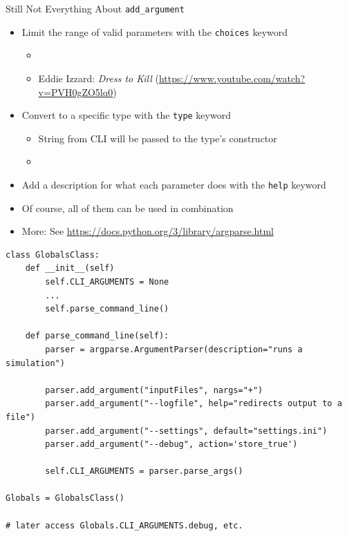 \begin{frame}[fragile]{Still Not Everything About \texttt{add\_argument}}
%
\begin{itemize}
\item Limit the range of valid parameters with the \texttt{choices} keyword
	\begin{itemize}
	\item {}
	\item Eddie Izzard: \emph{Dress to Kill} (\url{https://www.youtube.com/watch?v=PVH0gZO5lq0})
	\end{itemize}
\item Convert to a specific type with the \texttt{type} keyword
	\begin{itemize}
	\item String from CLI will be passed to the type's constructor
	\item {}
	\end{itemize}
\item Add a description for what each parameter does with the \texttt{help} keyword
\item Of course, all of them can be used in combination
\item More: See \url{https://docs.python.org/3/library/argparse.html}
\end{itemize}
%
\end{frame}


\begin{frame}[fragile]
%
\begin{codebox}[Globals.py]
\begin{verbatim}
class GlobalsClass:
    def __init__(self)
        self.CLI_ARGUMENTS = None
        ...
        self.parse_command_line()

    def parse_command_line(self):
        parser = argparse.ArgumentParser(description="runs a simulation")

        parser.add_argument("inputFiles", nargs="+")
        parser.add_argument("--logfile", help="redirects output to a file")
        parser.add_argument("--settings", default="settings.ini")
        parser.add_argument("--debug", action='store_true')

        self.CLI_ARGUMENTS = parser.parse_args()

Globals = GlobalsClass()

# later access Globals.CLI_ARGUMENTS.debug, etc.
\end{verbatim}
\end{codebox}
%
\end{frame}

